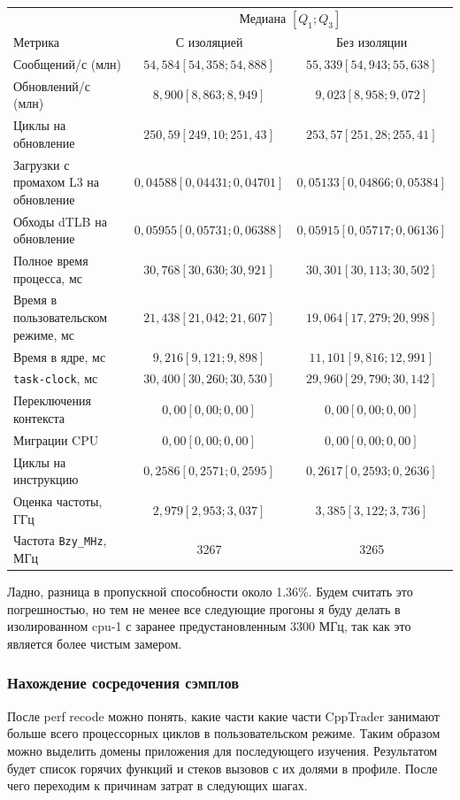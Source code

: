 \documentclass[a4paper,12pt]{article}
\begin{document}
\begin{center}
\small
\setlength{\tabcolsep}{3pt}
\begin{tabular}{lcc}
\toprule
& \multicolumn{2}{c}{Медиана \([Q_1; Q_3]\)} \\
Метрика & С изоляцией & Без изоляции \\
\midrule
Сообщений/с (млн) & $54,584 [54,358; 54,888]$ & $55{,}339 [54{,}943; 55{,}638]$ \\
Обновлений/с (млн) & $8,900 [8,863; 8,949]$ & $9{,}023 [8{,}958; 9{,}072]$ \\
Циклы на обновление & $250,59 [249,10; 251,43]$ & $253{,}57 [251{,}28; 255{,}41]$ \\
Загрузки с промахом L3 на обновление & $0,04588 [0,04431; 0,04701]$ & $0{,}05133 [0{,}04866; 0{,}05384]$ \\
Обходы dTLB на обновление & $0,05955 [0,05731; 0,06388]$ & $0{,}05915 [0{,}05717; 0{,}06136]$ \\
Полное время процесса, мс & $30,768 [30,630; 30,921]$ & $30{,}301 [30{,}113; 30{,}502]$ \\
Время в пользовательском режиме, мс & $21,438 [21,042; 21,607]$ & $19{,}064 [17{,}279; 20{,}998]$ \\
Время в ядре, мс & $9,216 [9,121; 9,898]$ & $11{,}101 [9{,}816; 12{,}991]$ \\
\texttt{task-clock}, мс & $30,400 [30,260; 30,530]$ & $29{,}960 [29{,}790; 30{,}142]$ \\
Переключения контекста & $0,00 [0,00; 0,00]$ & $0{,}00 [0{,}00; 0{,}00]$ \\
Миграции CPU & $0,00 [0,00; 0,00]$ & $0{,}00 [0{,}00; 0{,}00]$ \\
Циклы на инструкцию & $0,2586 [0,2571; 0,2595]$ & $0{,}2617 [0{,}2593; 0{,}2636]$ \\
Оценка частоты, ГГц & $2,979 [2,953; 3,037]$ & $3{,}385 [3{,}122; 3{,}736]$ \\
Частота \texttt{Bzy\_MHz}, МГц & 3267 & 3265 \\
\bottomrule
\end{tabular}
\end{center}

Ладно, разница в пропускной способности около 1.36\%. Будем считать это
погрешностью,  но тем не менее все следующие прогоны я буду делать в
изолированном cpu-1 с заранее предустановленным 3300 МГц, так как это является
более чистым замером.

\subsubsection{Нахождение сосредочения сэмплов}
После perf recode можно понять, какие части какие части CppTrader занимают больше всего 
процессорных циклов в пользовательском режиме. Таким образом можно выделить
домены приложения для последующего изучения. Результатом будет список горячих
функций и стеков вызовов с их долями в профиле. После чего переходим к причинам
затрат в следующих шагах.
\end{document}
